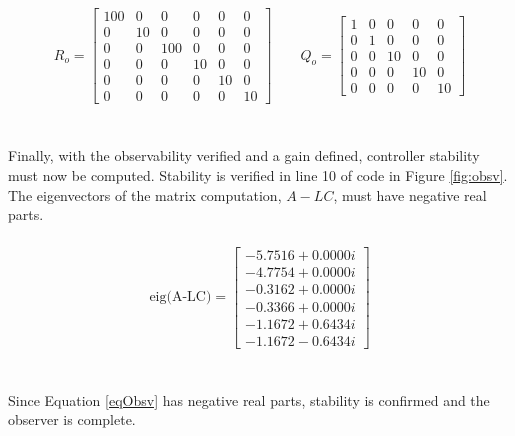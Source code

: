\documentclass[12pt]{article}
\begin{document}
\begin{equation}
\begin{aligned}
\label{qnro}
R_{o} = \begin{bmatrix} 100 & 0 & 0 & 0 & 0 & 0\\ 0 & 10 & 0 & 0 & 0 & 0\\ 0 & 0 & 100 & 0 & 0 & 0\\ 0 & 0 & 0 & 10 & 0 & 0\\ 0 & 0 & 0 & 0 & 10 & 0\\ 0 & 0 & 0 & 0 & 0 & 10 \end{bmatrix}
\qquad
Q_{o} = \begin{bmatrix} 1 & 0 & 0 & 0 & 0\\ 0 & 1 & 0 & 0 & 0\\ 0 & 0 & 10 & 0 & 0\\ 0 & 0 & 0 & 10 & 0\\ 0 & 0 & 0 & 0 & 10 \end{bmatrix}
\end{aligned}
\end{equation}
\\ \\
Finally, with the observability verified and a gain defined, controller stability must now be computed. Stability is verified in line 10 of code in Figure \ref{fig:obsv}. The eigenvectors of the matrix computation,  $A-LC$, must have negative real parts.
\\ \\
\begin{equation} \label{eqObsv} \begin{aligned}
\textrm{eig(A-LC)} = \begin{bmatrix}
-5.7516 + 0.0000i \\ -4.7754 + 0.0000i \\ -0.3162 + 0.0000i \\ -0.3366 + 0.0000i \\ -1.1672 + 0.6434i \\ -1.1672 - 0.6434i
\end{bmatrix} \end{aligned} \end{equation}
\\ \\
Since Equation \eqref{eqObsv} has negative real parts, stability is confirmed and the observer is complete.
\end{document}

